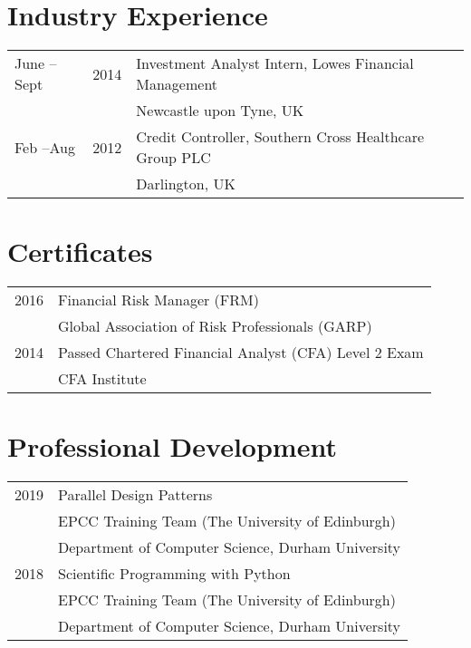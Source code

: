 \documentclass[margin,line,pifont,palatino,courier]{res}
\begin{document}
\begin{resume}
\section{\sc \bf Industry Experience}

\begin{tabular}{@{}p{0.8in}p{0.5in}p{4in}}

June --Sept&2014 & Investment Analyst Intern, Lowes Financial Management \\
&&Newcastle upon Tyne, UK\\
\rule{0pt}{4ex}Feb --Aug & 2012& Credit Controller, Southern Cross Healthcare Group PLC \\
&&Darlington, UK
\end{tabular}

\hrulefill

\section{\sc \bf Certificates}

\begin{tabular}{@{}p{0.8in}p{4in}}

2016 & Financial Risk Manager (FRM) \\
& Global Association of Risk Professionals (GARP)\\
 \rule{0pt}{4ex}2014 & Passed Chartered Financial Analyst (CFA) Level 2 Exam \\
& CFA Institute
\end{tabular}

\hrulefill

\section{\sc \bf Professional Development}

\begin{tabular}{@{}p{0.8in}p{4in}}

2019 & Parallel Design Patterns\\
&EPCC Training Team (The University of Edinburgh)\\
&Department of Computer Science, Durham University\\

\rule{0pt}{4ex}2018 & Scientific Programming with Python\\
&EPCC Training Team (The University of Edinburgh)\\
&Department of Computer Science, Durham University\\


\end{tabular}
\end{resume}
\end{document}
